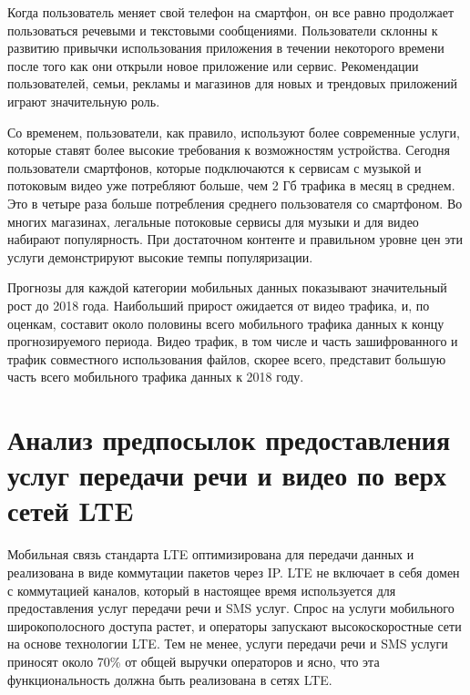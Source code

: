 Когда пользователь меняет свой телефон на смартфон, он все равно продолжает пользоваться речевыми и текстовыми сообщениями. Пользователи склонны к развитию привычки использования приложения в течении некоторого времени после того как они открыли новое приложение или сервис. Рекомендации пользователей, семьи, рекламы и магазинов для новых и трендовых приложений играют значительную роль. 

Со временем, пользователи, как правило, используют более современные услуги, которые ставят более высокие требования к возможностям устройства. Сегодня пользователи смартфонов, которые подключаются к сервисам с музыкой и потоковым видео уже потребляют больше, чем 2 Гб трафика в месяц в среднем. Это в четыре раза больше потребления среднего пользователя со смартфоном. Во многих магазинах, легальные потоковые сервисы для музыки и для видео набирают популярность. При достаточном контенте и правильном уровне цен эти услуги демонстрируют высокие темпы популяризации.

Прогнозы для каждой категории мобильных данных показывают значительный рост до 2018 года. Наибольший прирост ожидается от видео трафика, и, по оценкам, составит около половины всего мобильного трафика данных к концу прогнозируемого периода. Видео трафик, в том числе и часть зашифрованного и трафик совместного использования файлов, скорее всего, представит большую часть всего мобильного трафика данных к 2018 году.


















\section{Анализ предпосылок предоставления услуг передачи речи и видео по верх сетей LTE} \label{sect1_4}



Мобильная связь стандарта LTE оптимизирована для передачи данных и реализована в виде коммутации пакетов через IP. LTE не включает в себя домен с коммутацией каналов, который в настоящее время используется для предоставления услуг передачи речи и SMS услуг. Спрос на услуги мобильного широкополосного доступа растет, и операторы запускают высокоскоростные сети на основе технологии LTE. Тем не менее, услуги передачи речи и SMS услуги приносят около 70\% от общей выручки операторов и ясно, что эта функциональность должна быть реализована в сетях LTE.

